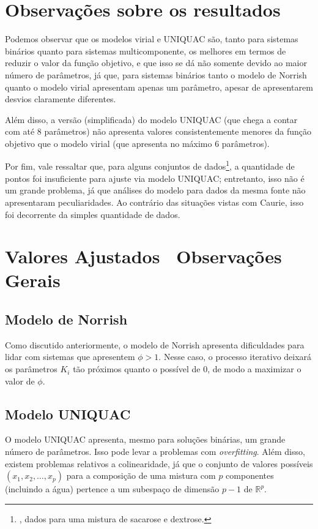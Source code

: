 \documentclass[
	12pt,				%
	openright,
	twoside,
	a4paper,			%
	english,			%
	french,				%
	spanish,			%
	brazil				%
	]{abntex2}
\begin{document}
\section{Observações sobre os resultados}

Podemos observar que os modelos virial e UNIQUAC são, tanto para sistemas
binários quanto para sistemas multicomponente, os melhores em termos de
reduzir o valor da função objetivo, e que isso se dá não somente devido ao maior
número de parâmetros, já que, para sistemas binários tanto o modelo de Norrish
quanto o modelo virial apresentam apenas um parâmetro, apesar de apresentarem desvios
claramente diferentes.

Além disso, a versão (simplificada) do modelo UNIQUAC (que chega a contar com até 8
parâmetros) não apresenta valores consistentemente menores da função objetivo que o
modelo virial (que apresenta no máximo 6 parâmetros).

Por fim, vale ressaltar que, para alguns conjuntos de dados\footnote{%
	\cite{norrish1966}, dados para uma mistura de sacarose e dextrose.
}, a quantidade de pontos foi insuficiente para ajuste via modelo UNIQUAC;
entretanto, isso não é um grande problema, já que análises do modelo para
dados da mesma fonte não apresentaram peculiaridades. Ao contrário das situações
vistas com Caurie, isso foi decorrente da simples quantidade de dados.



\section{Valores Ajustados \textendash\ Observações Gerais}

\subsection{Modelo de Norrish}

Como discutido anteriormente, o modelo de Norrish apresenta dificuldades para
lidar com sistemas que apresentem $\phi > 1$. Nesse caso, o processo iterativo
deixará os parâmetros $K_i$ tão próximos quanto o possível de 0, de modo a
maximizar o valor de $\phi$.

\subsection{Modelo UNIQUAC}

O modelo UNIQUAC apresenta, mesmo para soluções binárias, um grande número
de parâmetros. Isso pode levar a problemas com \textit{overfitting}. Além disso,
existem problemas relativos a colinearidade, já que o conjunto de valores
possíveis $(x_1,x_2,\ldots,x_p)$ para a composição de uma mistura com $p$
componentes (incluindo a água) pertence a um subespaço de dimensão $p-1$
de $\mathbb{R}^p$.
\end{document}
